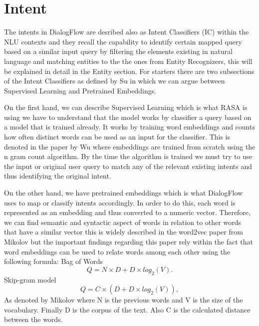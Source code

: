 \section{Intent}

The intents in DialogFlow are desribed also as Intent Classifiers (IC) within the NLU contexts and they recall the capability to identify certain mapped query based on a similar input query by filtering the elements existing in natural language and matching entities to the the ones from Entity Recognizers, this will be explained in detail in the Entity section. For starters there are two subsections of the Intent Classifiers as defined by Su \cite{amazon_nlu} in which we can argue between Supervised Learning and Pretrained Embeddings.

On the first hand, we can describe Supervised Learning which is what RASA is using we have to understand that the model works by classifier a query based on a model that is trained already. It works by training word embeddings and counts how often distinct words can be used as an input for the classifier. This is denoted in the paper by Wu \cite{amazon_space} where embeddings are trained from scratch using the n gram count algorithm. By the time the algorithm is trained we must try to use the input or original user query to match any of the relevant existing intents and thus identifying the original intent.

On the other hand, we have pretrained embeddings which is what DialogFlow uses to map or classify intents accordingly. In order to do this, each word is represented as an embedding and thus converted to a numeric vector. Therefore, we can find semantic and syntactic aspect of words in relation to other words that have a similar vector this is widely described in the word2vec paper from Mikolov \cite{word2vec} but the important findings regarding this paper rely within the fact that word embeddings can be used to relate words among each other using the following formula:
\newline
\newline
Bag of Words
\begin{equation}
Q = N \times D + D \times log_{2}(V).
\label{eq1}
\end{equation}
Skip-gram model
\begin{equation}
Q = C \times (D + D \times log_{2}(V)),
\end{equation}
\newline
As denoted by Mikolov where N is the previous words and V is the size of the vocabulary. Finally D is the corpus of the text. Also C is the calculated distance between the words.
\cite{word2vec}

